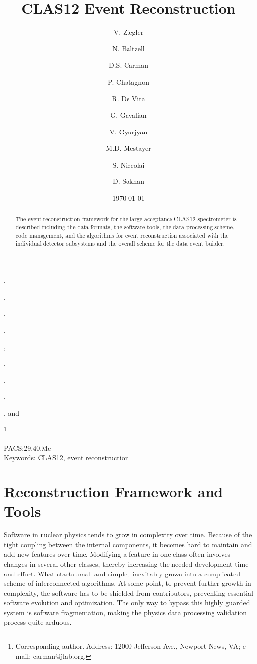 \documentclass{elsart}
\begin{document}
\begin{frontmatter}

\title{CLAS12 Event Reconstruction}

\author[JLab]{V. Ziegler},
\author[JLab]{N. Baltzell},
\author[JLab]{D.S. Carman},
\author[Saclay]{P. Chatagnon},
\author[INFN]{R. De Vita},
\author[JLab]{G. Gavalian},
\author[JLab]{V. Gyurjyan}, 
\author[JLab]{M.D. Mestayer}, 
\author[Saclay]{S. Niccolai}, and
\author[Glasgow]{D. Sokhan}

\address[JLab]{Thomas Jefferson National Accelerator Facility, Newport News, VA 23606, USA}
\address[INFN]{INFN, Sezione di Genova, 16146 Genova, Italy}
\address[Saclay]{Institut de Physique Nucl\'eaire, CNRS-IN2P3, Univ. Paris-Sud, Universit\'e Paris-Saclay,
  91406 Orsay Cedex, France}
\address[Glasgow]{University of Glasgow, Glasgow G12 8QQ, United Kingdom}
\thanks[corresponding]{Corresponding author. Address: 12000 Jefferson Ave., Newport News, VA; 
e-mail: carman@jlab.org.}

\date{\today}


\begin{abstract}
  The event reconstruction framework for the large-acceptance CLAS12 spectrometer is described including
  the data formats, the software tools, the data processing scheme, code management, and the algorithms
  for event reconstruction associated with the individual detector subsystems and the overall scheme for the
  data event builder.
\end{abstract}

\end{frontmatter}

PACS:29.40.Mc \\
Keywords: CLAS12, event reconstruction
\newpage

\newpage
\tableofcontents

\vfil
\eject

\section{Reconstruction Framework and Tools}

Software in nuclear physics tends to grow in complexity over time. Because of the tight coupling between
the internal components, it becomes hard to maintain and add new features over time. Modifying a feature
in one class often involves changes in several other classes, thereby increasing the needed development
time and effort. What starts small and simple, inevitably grows into a complicated scheme of interconnected
algorithms. At some point, to prevent further growth in complexity, the software has to be shielded from
contributors, preventing essential software evolution and optimization. The only way to bypass this highly
guarded system is software fragmentation, making the physics data processing validation process quite
arduous.
\end{document}
